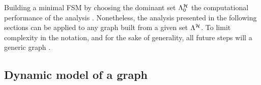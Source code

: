 Building a minimal FSM by choosing the dominant set $\Lambda^{\mathcal{H}}_0$  the computational performance of the analysis .
Nonetheless, the analysis presented in the following sections can be applied to any graph built from a given set $\Lambda^{\mathcal{H}}$.
To limit complexity in the notation, and for the sake of generality, all future steps will  a generic graph \removed{$\GG{\Lambda^{\strat}}$}\new{$\GG{\Lambda^{\strat}}=(\VV{\Lambda^{\strat}}, \EE{\Lambda^{\strat}})$}.


\subsection{Dynamic model of a graph}
\label{ssec:dynamicgraph}

